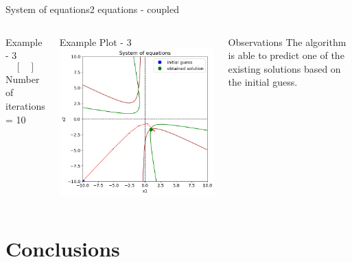 \documentclass{beamer}
\begin{document}
\begin{frame}{System of equations}{2 equations - coupled}
\begin{columns}[t]
\begin{block}{\footnotesize Example - 3}
\[\begin{bmatrix}
                \end{bmatrix}
            \]
            Number of iterations = 10
        \end{block}
        \begin{block}{\footnotesize Example Plot - 3}
            \scriptsize
            \includegraphics[width=\textwidth]{Figures/syseqns_3.png}
        \end{block}
        \vspace{-0.7em}
        \begin{block}{\footnotesize Observations}
            \scriptsize
            The algorithm is able to predict one of the existing solutions based on the initial guess.
        \end{block}
    \end{columns}
\end{frame}

\section{Conclusions}
\end{document}

